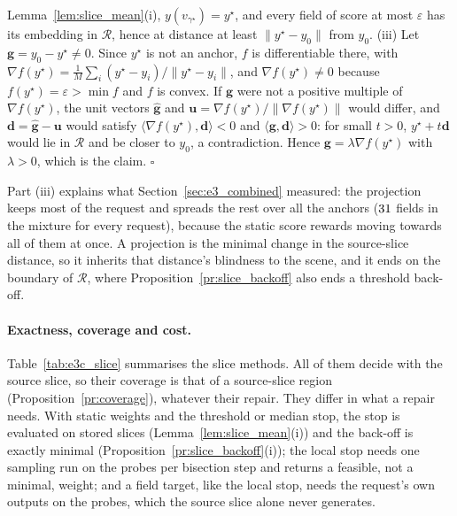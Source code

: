 \documentclass{article}
\theoremstyle{plain}
\theoremstyle{remark}
\begin{document}
Lemma~\ref{lem:slice_mean}(i), $y(v_{\gamma^\star})=y^\star$, and every field of score at most $\varepsilon$ has its embedding in $\mathcal R$, hence
at distance at least $\|y^\star-y_0\|$ from $y_0$.
(iii) Let $\mathbf g=y_0-y^\star\ne0$. Since $y^\star$ is not an anchor, $f$ is differentiable there, with
$\nabla f(y^\star)=\frac1M\sum_i(y^\star-y_i)/\|y^\star-y_i\|$, and $\nabla f(y^\star)\ne0$ because $f(y^\star)=\varepsilon>\min f$ and $f$ is convex. If
$\mathbf g$ were not a positive multiple of $\nabla f(y^\star)$, the unit vectors $\hat{\mathbf g}$ and $\mathbf u=\nabla f(y^\star)/\|\nabla f(y^\star)\|$ would
differ, and $\mathbf d=\hat{\mathbf g}-\mathbf u$ would satisfy $\langle\nabla f(y^\star),\mathbf d\rangle<0$ and $\langle\mathbf g,\mathbf d\rangle>0$: for small $t>0$,
$y^\star+t\mathbf d$ would lie in $\mathcal R$ and be closer to $y_0$, a contradiction. Hence $\mathbf g=\lambda\nabla f(y^\star)$ with $\lambda>0$, which is
the claim. \hfill$\square$

Part (iii) explains what Section~\ref{sec:e3_combined} measured: the projection keeps most of the request and spreads the rest over
all the anchors ($31$ fields in the mixture for every request), because the static score rewards moving towards all of
them at once. A projection is the minimal change in the source-slice distance, so it inherits that distance's blindness to the
scene, and it ends on the boundary of $\mathcal R$, where Proposition~\ref{pr:slice_backoff} also ends a threshold back-off.

\paragraph{Exactness, coverage and cost.}
Table~\ref{tab:e3c_slice} summarises the slice methods. All of them decide with the source slice, so their coverage is that of a
source-slice region (Proposition~\ref{pr:coverage}), whatever their repair. They differ in what a repair needs. With static weights and the threshold or median stop, the stop is evaluated on
stored slices (Lemma~\ref{lem:slice_mean}(i)) and the back-off is exactly minimal (Proposition~\ref{pr:slice_backoff}(i)); the local
stop needs one sampling run on the probes per bisection step and returns a feasible, not a minimal, weight; and a field target, like
the local stop, needs the request's own outputs on the probes, which the source slice alone never generates.
\end{document}
